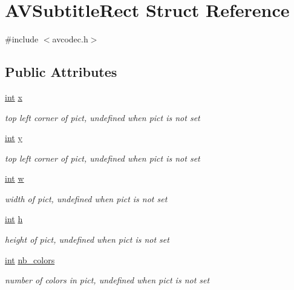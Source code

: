 \hypertarget{struct_a_v_subtitle_rect}{}\section{A\+V\+Subtitle\+Rect Struct Reference}
\label{struct_a_v_subtitle_rect}


{\ttfamily \#include $<$avcodec.\+h$>$}

\subsection*{Public Attributes}
\begin{DoxyCompactItemize}
\item 
\hyperlink{xmltok_8h_a5a0d4a5641ce434f1d23533f2b2e6653}{int} \hyperlink{struct_a_v_subtitle_rect_a0059c986f1ee3aab45c0f62f0709621b}{x}
\begin{DoxyCompactList}\small\item\em top left corner of pict, undefined when pict is not set \end{DoxyCompactList}\item 
\hyperlink{xmltok_8h_a5a0d4a5641ce434f1d23533f2b2e6653}{int} \hyperlink{struct_a_v_subtitle_rect_ab9e5fdd0c592636abf46530b110311bb}{y}
\begin{DoxyCompactList}\small\item\em top left corner of pict, undefined when pict is not set \end{DoxyCompactList}\item 
\hyperlink{xmltok_8h_a5a0d4a5641ce434f1d23533f2b2e6653}{int} \hyperlink{struct_a_v_subtitle_rect_a264a52200e34e138d47c76d7a431125a}{w}
\begin{DoxyCompactList}\small\item\em width of pict, undefined when pict is not set \end{DoxyCompactList}\item 
\hyperlink{xmltok_8h_a5a0d4a5641ce434f1d23533f2b2e6653}{int} \hyperlink{struct_a_v_subtitle_rect_afb3272792cfe659e9e788074d3328d3d}{h}
\begin{DoxyCompactList}\small\item\em height of pict, undefined when pict is not set \end{DoxyCompactList}\item 
\hyperlink{xmltok_8h_a5a0d4a5641ce434f1d23533f2b2e6653}{int} \hyperlink{struct_a_v_subtitle_rect_a7d5855be665def02c2d981a6ac1b7579}{nb\+\_\+colors}
\begin{DoxyCompactList}\small\item\em number of colors in pict, undefined when pict is not set \end{DoxyCompactList}\item 

\end{DoxyCompactItemize}
